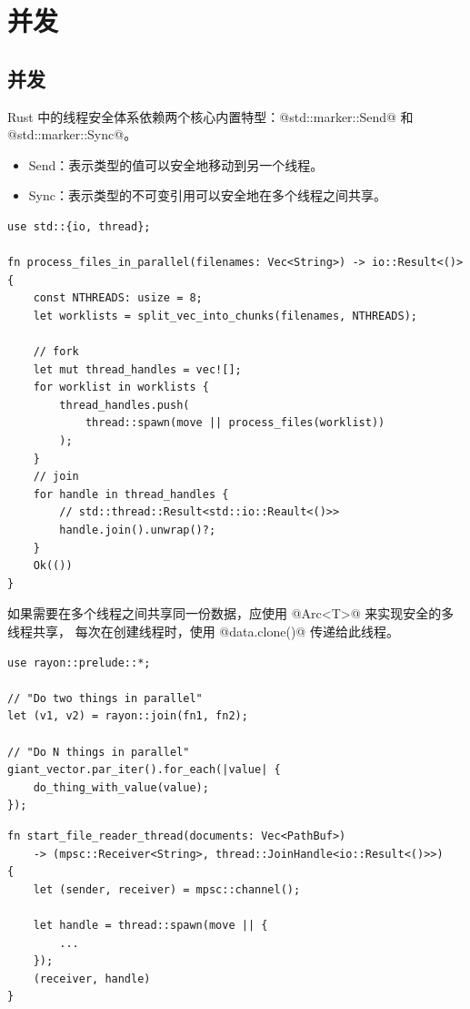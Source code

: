 \section{并发}
\subsection{并发}
Rust 中的线程安全体系依赖两个核心内置特型：@std::marker::Send@ 和 @std::marker::Sync@。
\begin{itemize}[itemsep=0.25em, parsep=0pt]
	\item Send：表示类型的值可以安全地移动到另一个线程。
	\item Sync：表示类型的不可变引用可以安全地在多个线程之间共享。
\end{itemize}

\begin{code}[title=fork and join]
\begin{verbatim}
use std::{io, thread};

fn process_files_in_parallel(filenames: Vec<String>) -> io::Result<()> {
    const NTHREADS: usize = 8;
    let worklists = split_vec_into_chunks(filenames, NTHREADS);

    // fork
    let mut thread_handles = vec![];
    for worklist in worklists {
        thread_handles.push(
            thread::spawn(move || process_files(worklist))
        );
    }
    // join
    for handle in thread_handles {
        // std::thread::Result<std::io::Reault<()>>
        handle.join().unwrap()?;  
    }
    Ok(())
}
\end{verbatim}
\end{code}

如果需要在多个线程之间共享同一份数据，应使用 @Arc<T>@ 来实现安全的多线程共享，
每次在创建线程时，使用 @data.clone()@ 传递给此线程。

\begin{code}[title=rayon]
\begin{verbatim}
use rayon::prelude::*;

// "Do two things in parallel"
let (v1, v2) = rayon::join(fn1, fn2);

// "Do N things in parallel"
giant_vector.par_iter().for_each(|value| {
    do_thing_with_value(value);
});
\end{verbatim}
\end{code}

\begin{code}[title=channel]
\begin{verbatim}
fn start_file_reader_thread(documents: Vec<PathBuf>)
    -> (mpsc::Receiver<String>, thread::JoinHandle<io::Result<()>>) 
{
    let (sender, receiver) = mpsc::channel();

    let handle = thread::spawn(move || {
        ... 
    });
    (receiver, handle)
}
\end{verbatim}
\end{code}

